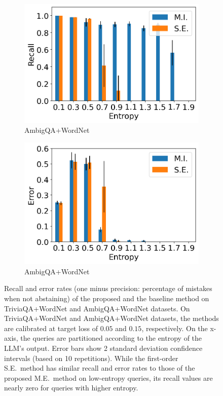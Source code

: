 \documentclass[a4paper]{article}
\theoremstyle{plain}
\theoremstyle{definition}
\theoremstyle{plain}
\begin{document}
\begin{figure}[t]
\begin{subfigure}{0.24\textwidth}
       \includegraphics[width=\textwidth]{recall-AmbigQA.png}
    \caption{AmbigQA+WordNet} \label{fig:REc}
  \end{subfigure}
  \begin{subfigure}{0.24\textwidth}
       \includegraphics[width=\textwidth]{error-AmbigQA.png}     
       \caption{AmbigQA+WordNet} \label{fig:REd}
  \end{subfigure}
\caption{Recall and error rates (one minus precision: percentage of mistakes when not abstaining) of the proposed and the baseline method on TriviaQA+WordNet and AmbigQA+WordNet datasets. On TriviaQA+WordNet and AmbigQA+WordNet datasets, the methods are calibrated at target loss of $0.05$ and $0.15$, respectively. On the x-axis, the queries are partitioned according to the entropy of the LLM's output. Error bars show 2 standard deviation confidence intervals (based on 10 repetitions). While the first-order S.E.\ method has similar recall and error rates to those of the proposed M.E.\ method on low-entropy queries, its recall values are nearly zero for queries with higher entropy.} 
\label{fig:RE}
\end{figure}
\end{document}

